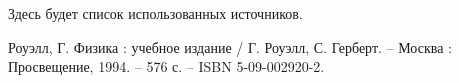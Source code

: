 \begingroup
\renewcommand{\section}[2]{\Anonchapter{Список использованных источников}}
\begin{thebibliography}{00}

    Здесь будет список использованных источников.

    Роуэлл, Г. Физика : учебное издание / Г. Роуэлл, С. Герберт. -- Москва : Просвещение, 1994. -- 576 с. -- ISBN 5-09-002920-2.

\end{thebibliography}
\endgroup

\clearpage
